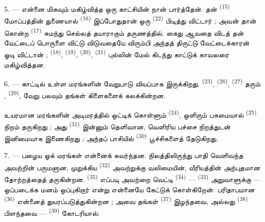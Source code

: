 \VUsaut{3.0mm}
\VUsaut{3.0mm}

5. --- என்னை மிகவும் மகிழ்வித்த ஒரு காட்சியின் 
நான் பார்த்தேன். தன் 
\textsuperscript{(15)} மோப்பத்தின் துணையால் 
\textsuperscript{(16)} இப்போதுதான் ஒரு  \textsuperscript{(22)} பிடித்து விட்டார் ; அவன் தான்
கொன்ற  \textsuperscript{(17)} சுமந்து செல்லத்
தயாராகும் தருணத்தில். கைது ஆவதை விடத் தன் வேட்டைப் பொருளை விட்டு
விடுவதையே விரும்பி அந்தத் திருட்டு வேட்டைக்காரன் ஓடி விட்டான் ;
 \textsuperscript{(18)}, 
\textsuperscript{(19)},  \textsuperscript{(20)},
 \textsuperscript{(21)} புல்லின் மேல்
கிடந்து காட்டுக் காவலரை மகிழ்வித்தன.

6. --- காட்டில் உள்ள மரங்களின் வேறுபாடு வியப்பாக இருக்கிறது.
 \textsuperscript{(23)},  \textsuperscript{(26)},  \textsuperscript{(27)}
தரும் , 
\textsuperscript{(29)}, வேறு பலவும் தங்கள் கிளைகளைக் கலக்கின்றன.

உயரமான மரங்களின் அடிமரத்தில் ஒட்டிக் கொள்ளும் 
\textsuperscript{(24)}, ஒளிரும் பசுமையால் 
\textsuperscript{(25)} நிறம் தருகிறது ; அது 
\textsuperscript{(31)} இன்னும் தெளிவான, வெளிரிய பச்சை நிறத்துடன்
இனிமையாக இணைகிறது ; அந்தப் பாசியில் 
\textsuperscript{(30)} பூச்சிகளைத் தேடுகிறது.

\VUsaut{3.0mm}
\VUsaut{3.0mm}

7. --- பழைய ஓக் மரங்கள் என்னைக் கவர்ந்தன. நிலத்திலிருந்து பாதி
வெளிவந்த அவற்றின் பருமனான, முறுக்கிய 
\textsuperscript{(32)} அவற்றுக்கு வலிமையின், வீரியத்தின் அற்புதமான
தோற்றத்தைத் தருகின்றன.  \textsuperscript{(35)}
எப்படி அவற்றை வெட்டி  \textsuperscript{(34)} —
 \textsuperscript{(33)} அறுவாளுக்கு —
ஒப்படைக்க மனம் ஒப்புகிறார் என்று என்னையே கேட்டுக் கொள்கிறேன்.
பரிதாபமான  \textsuperscript{(36)} என்னைத்
துயரப்படுத்துகின்றன ; அவை தங்கள் 
\textsuperscript{(37)} இழந்தவை, அல்லது 
\textsuperscript{(38)} பிளந்தவை — 
\textsuperscript{(39)} கோடரியால்.

